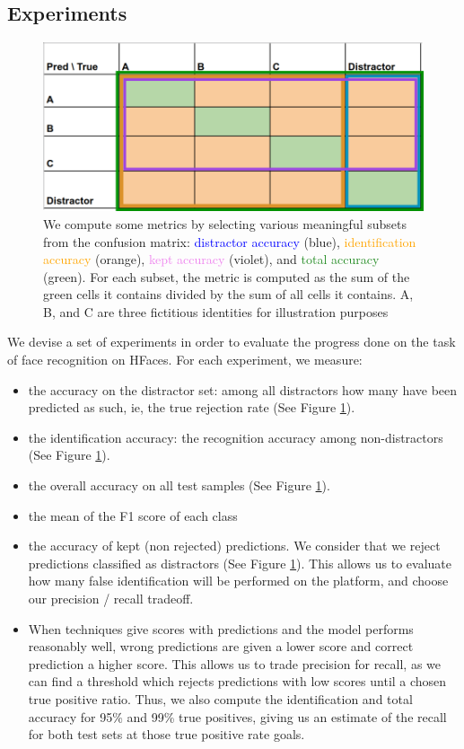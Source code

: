 \subsection{Experiments}

\begin{figure}
    \centering
    \includegraphics[width=0.6\columnwidth]{50-files/cm.png}
    \caption{We compute some metrics by selecting various meaningful subsets from the confusion matrix: \textcolor{blue}{distractor accuracy} (blue), \textcolor{orange}{identification accuracy} (orange), \textcolor{violet}{kept accuracy} (violet), and \textcolor{ForestGreen}{total accuracy} (green). For each subset, the metric is computed as the sum of the green cells it contains divided by the sum of all cells it contains. A, B, and C are three fictitious identities for illustration purposes}
    \label{fig:cm-metrics}
\end{figure}

We devise a set of experiments in order to evaluate the progress done on the task of face recognition on HFaces. For each experiment, we measure:
\begin{itemize}
    \item the accuracy on the distractor set: among all distractors how many have been predicted as such, ie, the true rejection rate (See Figure \ref{fig:cm-metrics}).
    \item the identification accuracy: the recognition accuracy among non-distractors (See Figure \ref{fig:cm-metrics}).
    \item the overall accuracy on all test samples (See Figure \ref{fig:cm-metrics}).
    \item the mean of the F1 score of each class
    \item the accuracy of kept (non rejected) predictions. We consider that we reject predictions classified as distractors (See Figure \ref{fig:cm-metrics}). This allows us to evaluate how many false identification will be performed on the platform, and choose our precision / recall tradeoff. 
    \item When techniques give scores with predictions and the model performs reasonably well, wrong predictions are given a lower score and correct prediction a higher score. This allows us to trade precision for recall, as we can find a threshold which rejects predictions with low scores until a chosen true positive ratio. Thus, we also compute the identification and total accuracy for 95\% and 99\% true positives, giving us an estimate of the recall for both test sets at those true positive rate goals.
\end{itemize}

